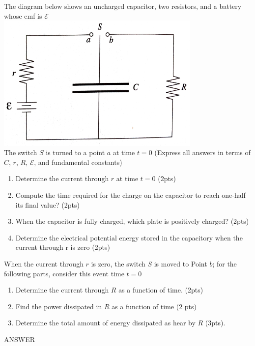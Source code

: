 \documentclass[10pt]{examdesign}
\begin{document}
	\begin{shortanswer}[title={Free Response (15 pts)},rearrange=no,resetcounter=no]
		\begin{question}
				The diagram below shows an uncharged capacitor, two resistors, and a battery whose emf is $ \mathcal{E} $ \\
				\includegraphics[width=10cm]{c1}
				\\
				The switch $ S $ is turned to a point $ a $ at time $ t = 0 $ 
				(Express all answers in terms of $ C $, $ r $, $ R $, $ \mathcal{E} $, and fundamental constants)
				\begin{enumerate}
					\item Determine the current through $ r $ at time $ t = 0 $ (2pts)
					\item Compute the time required for the charge on the capacitor to reach one-half its final value? (2pts)
					\item When the capacitor is fully charged, which plate is positively charged? (2pts)
					\item Determine the electrical potential energy stored in the capacitory when the current through r is zero (2pts)
				\end{enumerate}
				When the current through $ r $ is zero, the switch $ S $ is moved to Point $ b $; for the following parts, consider this event time $ t = 0 $
				\begin{enumerate}
					\item Determine the current through $ R $ as a function of time. (2pts)
					\item Find the power dissipated in $ R $ as a function of time (2 pts)
					\item Determine the total amount of energy dissipated as hear by $ R $ (3pts).
				\end{enumerate}
			\begin{answer}
				ANSWER

\end{answer}
\end{question}
\end{shortanswer}
\end{document}
